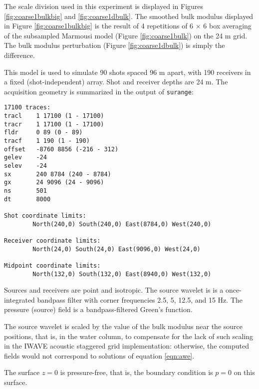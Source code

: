The scale division used in this experiment is displayed in Figures
\ref{fig:coarse1bulkbig} and \ref{fig:coarse1dbulk}. The smoothed bulk
modulus displayed in Figure \ref{fig:coarse1bulkbig} is the result of
4 repetitions of 6 $\times $ 6 box averaging of the subsampled
Marmousi model (Figure \ref{fig:coarse1bulk}) on the 24 m grid. The
  bulk modulus perturbation (Figure \ref{fig:coarse1dbulk}) is simply
  the difference.



This model is used to simulate 90 shots spaced 96 m apart, with 190
receivers in a fixed (shot-independent) array. Shot and receiver
depths are 24 m. The acquisition geometry is summarized in the output
of {\tt surange}:
\begin{verbatim}
17100 traces:
tracl    1 17100 (1 - 17100)
tracr    1 17100 (1 - 17100)
fldr     0 89 (0 - 89)
tracf    1 190 (1 - 190)
offset   -8760 8856 (-216 - 312)
gelev    -24
selev    -24
sx       240 8784 (240 - 8784)
gx       24 9096 (24 - 9096)
ns       501
dt       8000

Shot coordinate limits:
        North(240,0) South(240,0) East(8784,0) West(240,0)

Receiver coordinate limits:
        North(24,0) South(24,0) East(9096,0) West(24,0)

Midpoint coordinate limits:
        North(132,0) South(132,0) East(8940,0) West(132,0)
\end{verbatim}

Sources and receivers are point and isotropic. The source wavelet is
is a once-integrated bandpass filter with corner frequencies 2.5, 5,
12.5, and 15 Hz. The pressure (source) field is a
bandpass-filtered Green's function.  

The source wavelet is scaled by the value of the bulk modulus near the
source positions, that is, in the water column, to compensate for the
lack of such scaling in the IWAVE acoustic staggered grid
implementation: otherwise, the computed fields would not correspond to
solutions of equation \ref{eqn:awe}.

The surface $z=0$ is pressure-free, that is, the boundary condition is
$p=0$ on this surface.

